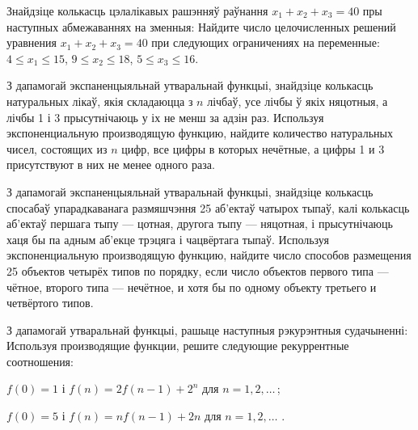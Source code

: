 \begin{problemList}
\problemItemWithCommonPart
{Знайдзіце колькасць цэлалікавых рашэнняў раўнання $x_1 + x_2 + x_3 = 40$ пры наступных
абмежаваннях на зменныя:}
{Найдите число целочисленных решений уравнения $x_1 + x_2 + x_3 = 40$ при
следующих ограничениях на переменные:}
{$4 \le x_1 \le 15$, $9 \le x_2 \le 18$, $5 \le x_3 \le 16$.}

\problemItemSimple
{З дапамогай экспаненцыяльнай утваральнай функцыі, знайдзіце колькасць натуральных лікаў,
якія складаюцца з $n$ лічбаў, усе лічбы ў якіх няцотныя, а лічбы 1 і 3 прысутнічаюць у іх
не менш за адзін раз.}
{Используя экспоненциальную производящую функцию, найдите количество
натуральных чисел, состоящих из $n$ цифр, все цифры в которых нечётные, а цифры 1 и 3
присутствуют в них не менее одного раза.}

\problemItemSimple
{З дапамогай экспаненцыяльнай утваральнай функцыі, знайдзіце колькасць спосабаў упарадкаванага размяшчэння
25 аб'ектаў чатырох тыпаў, калі колькасць аб'ектаў першага тыпу --- цотная, другога тыпу --- няцотная,
і прысутнічаюць хаця бы па адным аб'екце трэцяга і чацвёртага тыпаў.}
{Используя экспоненциальную производящую функцию, найдите число способов
размещения 25 объектов четырёх типов по порядку, если число объектов первого
типа --- чётное, второго типа --- нечётное, и хотя бы по одному объекту третьего и
четвёртого типов.}

\problemItemWithCommonPart
{З дапамогай утваральнай функцыі, рашыце наступныя рэкурэнтныя судачыненні:}
{Используя производящие функции, решите следующие рекуррентные соотношения:}
{\begin{belarusianEnumerate}
  \item $f(0) = 1$ і $f(n) = 2f(n - 1) + 2^n$ для $n = 1, 2, \ldots\, $;
  \item $f(0) = 5$ і $f(n) = nf(n - 1) + 2n$ для $n = 1, 2, \ldots\,\, $.
\end{belarusianEnumerate}}

\end{problemList}


